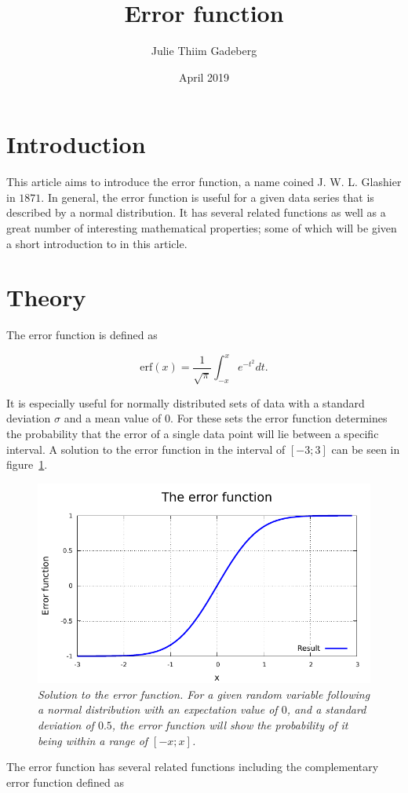 \documentclass[12pt, twocolumn]{article}
\title{Error function}
\author{Julie Thiim Gadeberg}
\date{April 2019}
\begin{document}
\maketitle



\section*{Introduction}
This article aims to introduce the error function, a name coined J. W. L. Glashier in $1871$. In general, the error function is useful for a given data series that is described by a normal distribution. It has several related functions as well as a great number of interesting mathematical properties; some of which will be given a short introduction to in this article. 

\section*{Theory}

The error function is defined as

\begin{equation*}
    \textrm{erf}(x) = \frac{1}{\sqrt{\pi}} \int_{-x}^{x} e^{-t^{2}} dt.
\end{equation*}

\noindent It is especially useful for normally distributed sets of data with a standard deviation $\sigma$ and a mean value of $0$. For these sets the error function determines the probability that the error of a single data point will lie between a specific interval. A solution to the error function in the interval of $[-3;3]$ can be seen in figure~\ref{fig:err_fun}.
\begin{figure}[t]
	\centering
	\includegraphics[width = 0.9\columnwidth]{plot_err.pdf}
	\caption{\sl Solution to the error function. For a given random variable following a normal distribution with an expectation value of $0$, and a standard deviation of $0.5$, the error function will show the probability of it being within a range of $[-x;x]$.}
	\label{fig:err_fun}
\end{figure}
The error function has several related functions including the complementary error function defined as 
\end{document}
